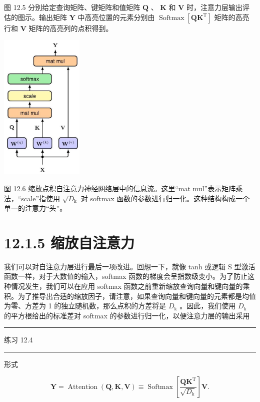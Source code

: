 \documentclass[10pt]{report}
\newcommand{\HRule}{\begin{center}\rule{0.9\linewidth}{0.2mm}\end{center}}
\begin{document}
图 12.5 分别给定查询矩阵、键矩阵和值矩阵 \(\mathbf{Q}\) 、 \(\mathbf{K}\) 和 \(\mathbf{V}\) 时，注意力层输出评估的图示。输出矩阵 \(\mathbf{Y}\) 中高亮位置的元素分别由 \(\operatorname{Softmax}\left\lbrack  {\mathbf{Q}{\mathbf{K}}^{\mathrm{T}}}\right\rbrack\) 矩阵的高亮行和 \(\mathbf{V}\) 矩阵的高亮列的点积得到。

\begin{center}
\includegraphics[max width=0.3\textwidth]{images/0194e279-9b28-703a-88f4-c3ac21e2010d_385_998_351_385_683_0.jpg}
\end{center}
\hspace*{3em} 

图 12.6 缩放点积自注意力神经网络层中的信息流。这里“mat mul”表示矩阵乘法，“scale”指使用 \(\sqrt{{D}_{\mathrm{k}}}\) 对 softmax 函数的参数进行归一化。这种结构构成一个单一的注意力“头”。

\section*{12.1.5 缩放自注意力}

我们可以对自注意力层进行最后一项改进。回想一下，就像 tanh 或逻辑 S 型激活函数一样，对于大数值的输入，softmax 函数的梯度会呈指数级变小。为了防止这种情况发生，我们可以在应用 softmax 函数之前重新缩放查询向量和键向量的乘积。为了推导出合适的缩放因子，请注意，如果查询向量和键向量的元素都是均值为零、方差为 1 的独立随机数，那么点积的方差将是 \({D}_{\mathrm{k}}\) 。因此，我们使用 \({D}_{\mathrm{k}}\) 的平方根给出的标准差对 softmax 的参数进行归一化，以便注意力层的输出采用

\HRule

练习 12.4

\HRule

形式

\[
\mathbf{Y} = \operatorname{Attention}\left( {\mathbf{Q},\mathbf{K},\mathbf{V}}\right)  \equiv  \operatorname{Softmax}\left\lbrack  \frac{{\mathbf{{QK}}}^{\mathrm{T}}}{\sqrt{{D}_{\mathrm{k}}}}\right\rbrack  \mathbf{V}. \tag{12.14}
\]
\end{document}
